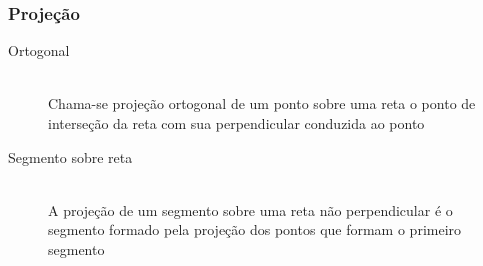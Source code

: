     \subsubsection{Projeção}
        \begin{description}
            \item[Ortogonal] \hfill \\
                Chama-se projeção ortogonal de um ponto sobre uma reta o ponto de interseção da reta com sua perpendicular conduzida ao ponto
            \item[Segmento sobre reta] \hfill \\
                A projeção de um segmento sobre uma reta não perpendicular é o segmento formado pela projeção dos pontos que formam o primeiro segmento
        \end{description}
